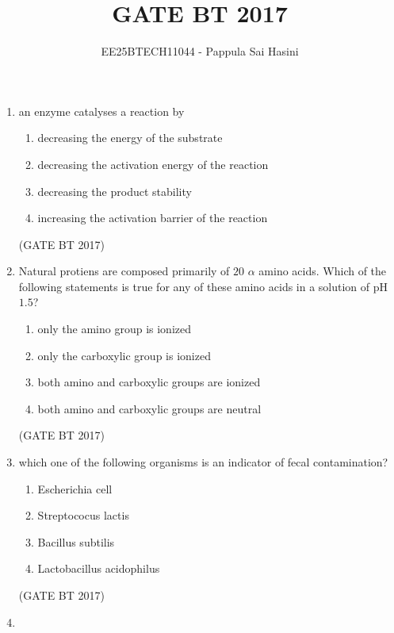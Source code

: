 \documentclass[journal,12pt,onecolumn]{IEEEtran}
\theoremstyle{remark}
\begin{document}
\title{GATE BT 2017}
\author{EE25BTECH11044 - Pappula Sai Hasini}
\maketitle
\renewcommand{\thefigure}{\theenumi}
\renewcommand{\thetable}{\theenumi}
\begin{enumerate}

 \item 

an enzyme catalyses a reaction by
 
 \begin{enumerate}
    \item decreasing the energy of the substrate 
    \item decreasing the activation energy of the reaction 
    \item decreasing the product stability
    \item increasing the activation barrier of the reaction
 \end{enumerate}
 \hfill (GATE BT 2017)
 \item 

 Natural protiens are composed primarily of $20$ $ \alpha $
amino acids. Which of the following statements is true for any of these amino acids in a solution of pH $1.5$?

\begin{enumerate}
    \item only the amino group is ionized
    \item only the carboxylic group is ionized 
    \item both amino and carboxylic groups are ionized
    \item both amino and carboxylic groups are neutral
\end{enumerate}
\hfill (GATE BT 2017)
\item 

which one of the following organisms is an indicator of fecal contamination?

\begin{enumerate}
    \item Escherichia cell
    \item Streptococus lactis
    \item Bacillus subtilis
    \item Lactobacillus acidophilus
\end{enumerate}
\hfill (GATE BT 2017)
\item 


\end{enumerate}
\end{document}
